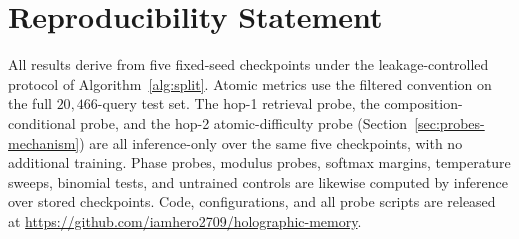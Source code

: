 \documentclass[11pt]{article}
\theoremstyle{definition}
\begin{document}
\section*{Reproducibility Statement}
All results derive from five fixed-seed checkpoints under the leakage-controlled
protocol of Algorithm~\ref{alg:split}. Atomic metrics use the filtered
convention on the full $20{,}466$-query test set. The hop-1 retrieval probe,
the composition-conditional probe, and the hop-2 atomic-difficulty probe
(Section~\ref{sec:probes-mechanism}) are all inference-only over the same five
checkpoints, with no additional training. Phase probes, modulus probes, softmax
margins, temperature sweeps, binomial tests, and untrained controls are likewise
computed by inference over stored checkpoints. Code, configurations, and all
probe scripts are released at
\url{https://github.com/iamhero2709/holographic-memory}.
\end{document}
